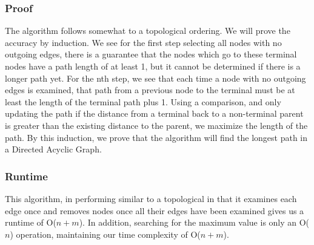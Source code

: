 \documentclass[titlepage]{article}
\numberwithin{equation}{subsection}
\begin{document}
\subsubsection{Proof}
The algorithm follows somewhat to a topological ordering. We will
prove the accuracy by induction. We see for the first step selecting
all nodes with no outgoing edges, there is a guarantee that the nodes
which go to these terminal nodes have a path length of at least 1, but
it cannot be determined if there is a longer path yet. For the nth step,
we see that each time a node with no outgoing edges is examined, that path
from a previous node to the terminal must be at least the length
of the terminal path plus 1. Using a comparison, and only updating
the path if the distance from a terminal back to a non-terminal
parent is greater than the existing distance to the parent,
we maximize the length of the path. By this induction, we prove that the
algorithm will find the longest path in a Directed Acyclic Graph.
\subsubsection{Runtime}
This algorithm, in performing similar to a topological in that it examines
each edge once and removes nodes once all their edges have been examined
gives us a runtime of O($n+m$). In addition, searching for the maximum value
is only an O($n$) operation, maintaining our time complexity of O($n+m$).
\end{document}
